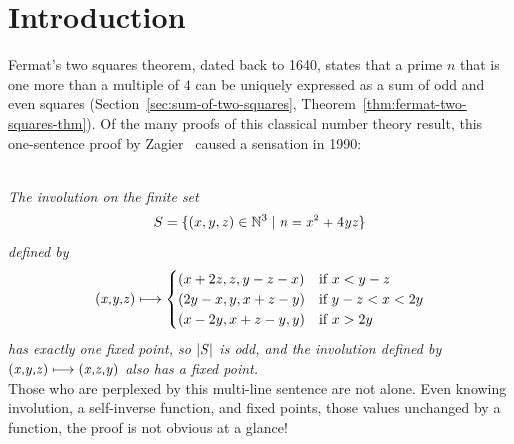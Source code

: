 \documentclass[sigplan,screen]{acmart}
\newcommand{\m}[1]{\todo[fancyline,color=blue!40,size=\scriptsize]{\textsf{JC: #1}}} %
\renewcommand{\HOLinline}[1]{\ensuremath{#1}} %
\renewcommand{\HOLNumLit}[1]{{\selectfont\textrm{\upshape #1}}} %
\renewcommand{\HOLSymConst}[1]{{\fontsize{9pt}{1em}\selectfont\textsf{\upshape #1}}}
\newenvironment{mquote}[1][2em]%
  {\list{}{\leftmargin=#1\rightmargin=#1}\item[]}%
  {\endlist}
\begin{document}

\setcounter{footnote}{0}

\section{Introduction}
\label{sec:introduction}
Fermat's two squares theorem, dated back to 1640, states that a prime $n$ that is one more than a multiple of $4$ can be uniquely expressed as a sum of odd and even squares (Section~\ref{sec:sum-of-two-squares}, Theorem~\ref{thm:fermat-two-squares-thm}).
Of the many proofs of this classical number theory result, this one-sentence proof by Zagier~\cite{Zagier-1990-acm} caused a sensation in 1990:

\bigskip
\begin{mquote} %
\textit{
\\ %
The involution on the finite set
\[
S = \{(x,y,z) \in \mathbb{N}^{3} \mid \HOLinline{\HOLFreeVar{n}\;\HOLSymConst{=}\;\HOLFreeVar{x}\HOLSymConst{\ensuremath{\sp{2}}}\;\HOLSymConst{\ensuremath{+}}\;\HOLNumLit{4}\HOLSymConst{\ensuremath{}}\HOLFreeVar{y}\HOLSymConst{\ensuremath{}}\HOLFreeVar{z}} \}
\]
defined by 
\begin{equation}
\label{eqn:zagier-map}
\HOLinline{(\HOLFreeVar{x}\HOLSymConst{,}\HOLFreeVar{y}\HOLSymConst{,}\HOLFreeVar{z})} \longmapsto
\begin{cases}
      (x + 2 z,z,y - z - x) & \text{if }x < y - z \\
      (2 y - x,y,x + z - y) & \text{if }y - z < x < 2y\\
      (x - 2 y,x + z - y,y) & \text{if }x > 2y
\end{cases}
\end{equation}
has exactly one fixed point, so \HOLinline{\ensuremath{|}\HOLFreeVar{S}\ensuremath{|}} is odd, and the involution defined by
$\HOLinline{(\HOLFreeVar{x}\HOLSymConst{,}\HOLFreeVar{y}\HOLSymConst{,}\HOLFreeVar{z})} \longmapsto \HOLinline{(\HOLFreeVar{x}\HOLSymConst{,}\HOLFreeVar{z}\HOLSymConst{,}\HOLFreeVar{y})}$
also has a fixed point.
\\ %
}
\end{mquote}
Those who are perplexed by this multi-line sentence are not alone.
Even knowing involution, a self-inverse function, and fixed points, those values unchanged by a function, the proof is not obvious at a glance!
\end{document}
